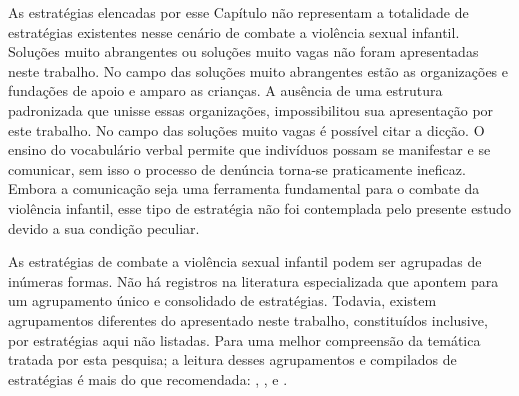 \vspace{-0.35cm}

As estratégias elencadas por esse Capítulo não representam a totalidade de estratégias existentes nesse cenário de combate a violência sexual infantil. Soluções muito abrangentes ou soluções muito vagas não foram apresentadas neste trabalho. No campo das soluções muito abrangentes estão as organizações e fundações de apoio e amparo as crianças. %
A ausência de uma estrutura padronizada que unisse essas organizações, impossibilitou sua apresentação por este trabalho. No campo das soluções muito vagas é possível citar a dicção. O ensino do vocabulário verbal permite que indivíduos possam se manifestar e se comunicar, sem isso o processo de denúncia torna-se praticamente ineficaz. Embora a comunicação seja uma ferramenta fundamental para o combate da violência infantil, esse tipo de estratégia não foi contemplada pelo presente estudo devido a sua condição peculiar. 




\vspace{-0.35cm}

As estratégias de combate a violência sexual infantil podem ser agrupadas de inúmeras formas. Não há registros na literatura especializada que apontem para um agrupamento único e consolidado de estratégias. Todavia, existem  agrupamentos diferentes do apresentado neste trabalho, constituídos inclusive, por estratégias aqui não listadas. Para uma melhor compreensão da temática tratada por esta pesquisa; a leitura desses agrupamentos e compilados de estratégias é mais do que recomendada: , ,  e .





